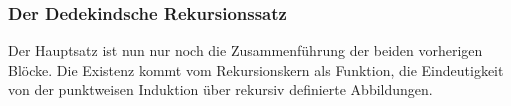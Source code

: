 \documentclass[main.tex]{subfiles}
\begin{document}
\subsubsection{Der Dedekindsche Rekursionssatz}

Der Hauptsatz ist nun nur noch die Zusammenführung der beiden vorherigen
Blöcke. Die Existenz kommt vom Rekursionskern als Funktion, die Eindeutigkeit
von der punktweisen Induktion über rekursiv definierte Abbildungen.

\end{document}

